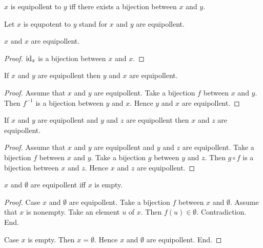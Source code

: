 \documentclass[../../set-theory.ftl.tex]{subfiles}
\begin{document}
  \begin{forthel}
    \begin{definition}
      $x$ is equipollent to $y$ iff there exists a bijection between $x$ and $y$.
    \end{definition}

    Let $x$ is equpotent to $y$ stand for $x$ and $y$ are equipollent.

    \begin{proposition}\label{SetTheory_02_06_639059}
      $x$ and $x$ are equipollent.
    \end{proposition}
    \begin{proof}
      $\operatorname{id}_{x}$ is a bijection between $x$ and $x$.
    \end{proof}

    \begin{proposition}\label{SetTheory_02_06_467393}
      If $x$ and $y$ are equipollent then $y$ and $x$ are equipollent.
    \end{proposition}
    \begin{proof}
      Assume that $x$ and $y$ are equipollent.
      Take a bijection $f$ between $x$ and $y$.
      Then $f^{-1}$ is a bijection between $y$ and $x$.
      Hence $y$ and $x$ are equipollent.
    \end{proof}

    \begin{proposition}\label{SetTheory_02_06_956273}
      If $x$ and $y$ are equipollent and $y$ and $z$ are equipollent then $x$ and $z$ are equipollent.
    \end{proposition}
    \begin{proof}
      Assume that $x$ and $y$ are equipollent and $y$ and $z$ are equipollent.
      Take a bijection $f$ between $x$ and $y$.
      Take a bijection $g$ between $y$ and $z$.
      Then $g \circ f$ is a bijection between $x$ and $z$.
      Hence $x$ and $z$ are equipollent.
    \end{proof}

    \begin{proposition}\label{SetTheory_02_06_430789}
      $x$ and $\emptyset$ are equipollent iff $x$ is empty.
    \end{proposition}
    \begin{proof}
      Case $x$ and $\emptyset$ are equipollent.
        Take a bijection $f$ between $x$ and $\emptyset$.
        Assume that $x$ is nonempty.
        Take an element $u$ of $x$.
        Then $f(u) \in \emptyset$.
        Contradiction.
      End.

      Case $x$ is empty.
        Then $x = \emptyset$.
        Hence $x$ and $\emptyset$ are equipollent.
      End.
    \end{proof}
  \end{forthel}
\end{document}
